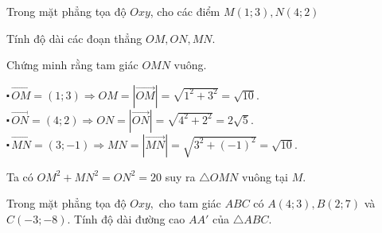 


\begin{bt}%
	Trong mặt phẳng tọa độ $Oxy$, cho các điểm $M(1;3), N(4;2)$
	\begin{listEX}[1]
		\item Tính độ dài các đoạn thẳng $OM, ON, MN$.
		\item Chứng minh rằng tam giác $OMN$ vuông.
	\end{listEX}
	\loigiai
	{
		\begin{listEX}[1]
			\item  $\centerdot \, \overrightarrow{OM}=(1;3)\Rightarrow OM=|\overrightarrow{OM}|=\sqrt{1^2+3^2}=\sqrt{10}$.\\
			$\centerdot \, \overrightarrow{ON}=(4;2)\Rightarrow ON=|\overrightarrow{ON}|=\sqrt{4^2+2^2}=2\sqrt{5}$.\\
			$\centerdot\, \overrightarrow{MN}=(3;-1)\Rightarrow MN=|\overrightarrow{MN}|=\sqrt{3^2+(-1)^2}=\sqrt{10}$.
			\item  Ta có $OM^2+MN^2=ON^2=20$ suy ra $\triangle OMN$ vuông tại $M$.
		\end{listEX}
	}
\end{bt}

\begin{bt}%
	Trong mặt phẳng tọa độ $Oxy,$ cho tam giác $ABC$ có $A(4;3), B(2;7)$ và $C(-3;-8)$. Tính độ dài đường cao $AA'$ của $\triangle ABC$. 
\end{bt}

